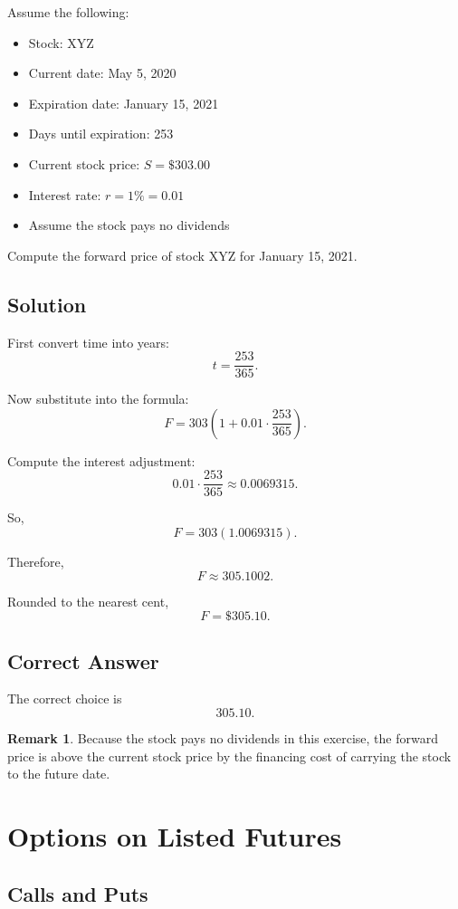 \documentclass[11pt]{article}
\theoremstyle{definition}
\newtheorem{remark}{Remark}[section]
\begin{document}
Assume the following:
\begin{itemize}[leftmargin=2em]
    \item Stock: XYZ
    \item Current date: May 5, 2020
    \item Expiration date: January 15, 2021
    \item Days until expiration: 253
    \item Current stock price: \(S = \$303.00\)
    \item Interest rate: \(r = 1\% = 0.01\)
    \item Assume the stock pays no dividends
\end{itemize}

Compute the forward price of stock XYZ for January 15, 2021.

\subsection{Solution}

First convert time into years:
\[
t = \frac{253}{365}.
\]

Now substitute into the formula:
\[
F = 303\left(1 + 0.01 \cdot \frac{253}{365}\right).
\]

Compute the interest adjustment:
\[
0.01 \cdot \frac{253}{365} \approx 0.0069315.
\]

So,
\[
F = 303(1.0069315).
\]

Therefore,
\[
F \approx 305.1002.
\]

Rounded to the nearest cent,
\[
\boxed{F = \$305.10.}
\]

\subsection{Correct Answer}

The correct choice is
\[
\boxed{305.10.}
\]

\begin{remark}
Because the stock pays no dividends in this exercise, the forward price is above the current stock price by the financing cost of carrying the stock to the future date.
\end{remark}

\section{Options on Listed Futures}

\subsection{Calls and Puts}
\end{document}
